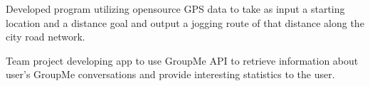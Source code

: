 \documentclass[11pt,letterpaper,serif]{moderncv}
\begin{document}
{
	\begin{adjustwidth}{.25in}{}
		Developed program utilizing opensource GPS data to take as input a starting location and a distance goal and output a jogging route of that distance along the city road network.
	\end{adjustwidth}
}

{
	\begin{adjustwidth}{.25in}{}
		Team project developing app to use GroupMe API to retrieve information about user's GroupMe conversations and provide interesting statistics to the user.
	\end{adjustwidth}
}
\end{document}
